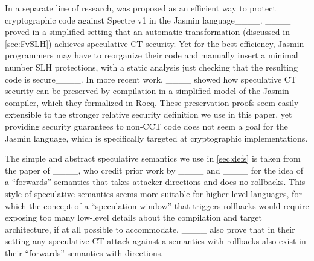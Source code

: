 In a separate line of research, \SelvSLH was proposed as an efficient way to
protect cryptographic code against Spectre v1 in the Jasmin
language____.
%
____ proved in a simplified setting that an automatic
\SelvSLH transformation (discussed in \autoref{sec:FvSLH}) achieves speculative
CT security.
%
Yet for the best efficiency, Jasmin programmers may have to reorganize their code
and manually insert a minimal number SLH protections, with a static analysis
just checking that the resulting code is secure____.
%
In more recent work, ____ showed how speculative CT security can
be preserved by compilation in a simplified model of the Jasmin compiler, which
they formalized in Rocq.
%
These preservation proofs seem easily extensible to the stronger relative
security definition we use in this paper, yet providing security guarantees to
non-CCT code does not seem a goal for the Jasmin language, which is specifically
targeted at cryptographic implementations.

The simple and abstract speculative semantics we use in \autoref{sec:defs} is
taken from the paper of ____, who credit prior work by
____ and ____ for the idea of a
``forwards'' semantics that takes attacker directions and does no rollbacks.
%
This style of speculative semantics seems more suitable for higher-level
languages, for which the concept of a ``speculation window'' that triggers
rollbacks would require exposing too many low-level details about the
compilation and target architecture, if at all possible to accommodate.
%
____ also prove that in their setting any speculative CT
attack against a semantics with rollbacks also exist in their ``forwards''
semantics with directions.